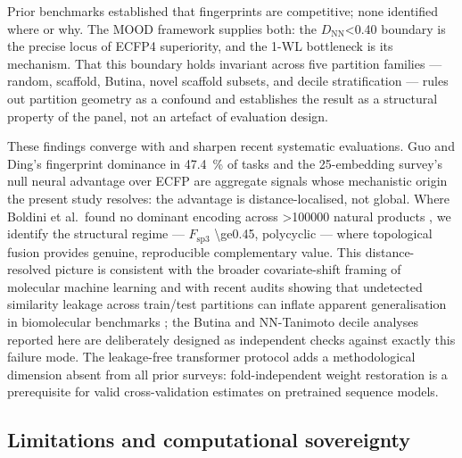 \documentclass[11pt,a4paper]{article}
\begin{document}
Prior benchmarks established that fingerprints are competitive; none identified where or why. The MOOD framework supplies both: the $D_{\text{NN}}$\num{<0.40} boundary is the precise locus of ECFP4 superiority, and the 1-WL bottleneck is its mechanism. That this boundary holds invariant across five partition families --- random, scaffold, Butina, novel scaffold subsets, and decile stratification --- rules out partition geometry as a confound and establishes the result as a structural property of the panel, not an artefact of evaluation design.

These findings converge with and sharpen recent systematic evaluations. Guo and Ding's fingerprint dominance in \qty{47.4}{\percent} of tasks \citep{guo_ding_2026} and the 25-embedding survey's null neural advantage over ECFP \citep{benchmark_pretrained_2025} are aggregate signals whose mechanistic origin the present study resolves: the advantage is distance-localised, not global. Where Boldini et al.\ found no dominant encoding across \num{>100000} natural products \citep{boldini2024}, we identify the structural regime --- $F_{\mathrm{sp3}}$ \num{\ge0.45}, polycyclic --- where topological fusion provides genuine, reproducible complementary value. This distance-resolved picture is consistent with the broader covariate-shift framing of molecular machine learning \citep{klarner2023covariate} and with recent audits showing that undetected similarity leakage across train/test partitions can inflate apparent generalisation in biomolecular benchmarks \citep{joeres2025datasail,joeres2026datasailaddendum}; the Butina and NN-Tanimoto decile analyses reported here are deliberately designed as independent checks against exactly this failure mode. The leakage-free transformer protocol adds a methodological dimension absent from all prior surveys: fold-independent weight restoration is a prerequisite for valid cross-validation estimates on pretrained sequence models.

\subsection{Limitations and computational sovereignty}
\end{document}
